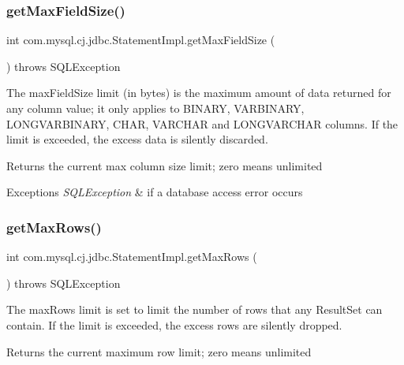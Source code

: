 \subsubsection{\texorpdfstring{get\+Max\+Field\+Size()}{getMaxFieldSize()}}
{\footnotesize\ttfamily int com.\+mysql.\+cj.\+jdbc.\+Statement\+Impl.\+get\+Max\+Field\+Size (\begin{DoxyParamCaption}{ }\end{DoxyParamCaption}) throws S\+Q\+L\+Exception}

The max\+Field\+Size limit (in bytes) is the maximum amount of data returned for any column value; it only applies to B\+I\+N\+A\+RY, V\+A\+R\+B\+I\+N\+A\+RY, L\+O\+N\+G\+V\+A\+R\+B\+I\+N\+A\+RY, C\+H\+AR, V\+A\+R\+C\+H\+AR and L\+O\+N\+G\+V\+A\+R\+C\+H\+AR columns. If the limit is exceeded, the excess data is silently discarded.

\begin{DoxyReturn}{Returns}
the current max column size limit; zero means unlimited
\end{DoxyReturn}

\begin{DoxyExceptions}{Exceptions}
{\em S\+Q\+L\+Exception} & if a database access error occurs \\
\hline
\end{DoxyExceptions}
\mbox{\label{classcom_1_1mysql_1_1cj_1_1jdbc_1_1_statement_impl_ae2447bc18fbb4aba8ef64f48f0c90c36}} 
\subsubsection{\texorpdfstring{get\+Max\+Rows()}{getMaxRows()}}
{\footnotesize\ttfamily int com.\+mysql.\+cj.\+jdbc.\+Statement\+Impl.\+get\+Max\+Rows (\begin{DoxyParamCaption}{ }\end{DoxyParamCaption}) throws S\+Q\+L\+Exception}

The max\+Rows limit is set to limit the number of rows that any Result\+Set can contain. If the limit is exceeded, the excess rows are silently dropped.

\begin{DoxyReturn}{Returns}
the current maximum row limit; zero means unlimited
\end{DoxyReturn}


